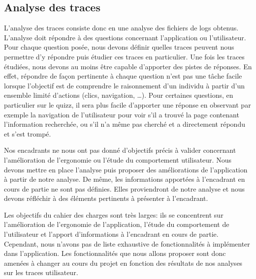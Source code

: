         \subsection{Analyse des traces}
            
            L’analyse des traces consiste donc en une analyse des fichiers de logs obtenus. L’analyse doit répondre à des questions concernant l’application ou l’utilisateur. Pour chaque question posée, nous devons définir quelles traces peuvent nous permettre d’y répondre puis étudier ces traces en particulier. Une fois les traces étudiées, nous devons au moins être capable d’apporter des pistes de réponses. En effet, répondre de façon pertinente à chaque question n’est pas une tâche facile lorsque l’objectif est de comprendre le raisonnement d’un individu à partir d’un ensemble limité d’actions (clics, navigation, …). Pour certaines questions, en particulier sur le quizz, il sera plus facile d’apporter une réponse en observant par exemple la navigation de l’utilisateur pour voir s’il a trouvé la page contenant l’information recherchée, ou s’il n’a même pas cherché et a directement répondu et s’est trompé.
            
            Nos encadrants ne nous ont pas donné d’objectifs précis à valider concernant l’amélioration de l’ergonomie ou l’étude du comportement utilisateur. Nous devons mettre en place l’analyse puis proposer des améliorations de l’application à partir de notre analyse. De même, les informations apportées à l’encadrant en cours de partie ne sont pas définies. Elles proviendront de notre analyse et nous devons réfléchir à des éléments pertinents à présenter à l’encadrant.
            
            Les objectifs du cahier des charges sont très larges: ils se concentrent sur l’amélioration de l’ergonomie de l’application, l’étude du comportement de l’utilisateur et l’apport d’informations à l’encadrant en cours de partie. Cependant, nous n’avons pas de liste exhaustive de fonctionnalités à implémenter dans l’application. Les fonctionnalités que nous allons proposer sont donc amenées à changer au cours du projet en fonction des résultats de nos analyses sur les traces utilisateur.
            
            
